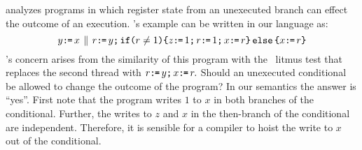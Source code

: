 \citet{BoehmOOTA} analyzes programs in which register state from an
unexecuted branch can effect the outcome of an execution.  
\citeauthor{BoehmOOTA}'s  example can be written in our language as:
\begin{equation}
  \label{rfub}
  y\texttt{:}\mkern-1mu\texttt{=}\, x
  \,\mathbin{\|}\,
  r\texttt{:}\mkern-1mu\texttt{=}\, y\texttt{;}\,\allowbreak
  \texttt{if}\allowbreak\texttt{(}r \neq 1\texttt{)} \allowbreak\texttt{\{} z\texttt{:}\mkern-1mu\texttt{=}\, 1\texttt{;}\,\allowbreak r\texttt{:}\mkern-1mu\texttt{=}\, 1\texttt{;}\,\allowbreak x\texttt{:}\mkern-1mu\texttt{=}\, r \texttt{\}}\,\allowbreak\texttt{else}\allowbreak\,\texttt{\{} x\texttt{:}\mkern-1mu\texttt{=}\, r \texttt{\}}
\end{equation}
\citeauthor{BoehmOOTA}'s concern arises from the similarity of this program
with the \oota\ litmus test that replaces the second thread with
\begin{math}
  r\texttt{:}\mkern-1mu\texttt{=}\, y\texttt{;}\,\allowbreak
  x\texttt{:}\mkern-1mu\texttt{=}\, r.
\end{math}
Should an unexecuted conditional be allowed to change the outcome of the
program?  In our semantics the answer is ``yes''.  First note that the
program writes $1$ to $x$ in both branches of the conditional.  Further, the
writes to $z$ and $x$ in the then-branch of the conditional are independent.
Therefore, it is sensible for a compiler to hoist the write to $x$ out of the
conditional.

